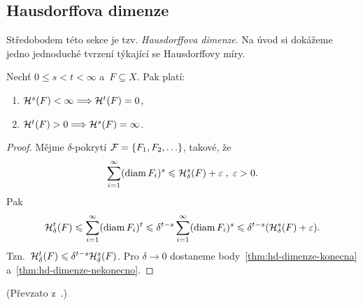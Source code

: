 \subsection{Hausdorffova dimenze}\label{subsec:hausdorffova-dimenze}

Středobodem této sekce je tzv. \emph{Hausdorffova dimenze}. Na úvod si dokážeme jedno jednoduché tvrzení týkající se Hausdorffovy míry.
\begin{theorem}\label{thm:hodnoty-hausdorffovy-miry}
    Nechť $0\leqslant s<t<\infty$ a~$F\subseteq X$. Pak platí:
    \begin{enumerate}[label=(\roman*)]
        \item\label{thm:hd-dimenze-konecna} $\mathcal{H}^{s}(F)<\infty\Longrightarrow\mathcal{H}^{t}(F)=0$,
        \item\label{thm:hd-dimenze-nekonecno} $\mathcal{H}^{t}(F)>0\Longrightarrow\mathcal{H}^{s}(F)=\infty$.
    \end{enumerate}
\end{theorem}
\begin{proof}
    Mějme $\delta$-pokrytí $\mathcal{F}=\left\{F_1,F_2,\ldots\right\}$, takové, že
    \[\sum_{i=1}^{\infty}(\operatorname{diam}{F_i})^s\leqslant\mathcal{H}_{\delta}^{s}(F)+\varepsilon\;,\;\varepsilon>0.\]
    Pak
    \[\mathcal{H}_{\delta}^{t}(F)\leqslant\sum_{i=1}^{\infty}(\operatorname{diam}{F_i})^t\leqslant\delta^{t-s}\sum_{i=1}^{\infty}(\operatorname{diam}{F_i})^s\leqslant\delta^{t-s}(\mathcal{H}_{\delta}^{s}(F)+\varepsilon).\]
    Tzn.~$\mathcal{H}_{\delta}^{t}(F)\leqslant\delta^{t-s}\mathcal{H}_{\delta}^{s}(F)$. Pro $\delta\to 0$ dostaneme body~\ref{thm:hd-dimenze-konecna} a~\ref{thm:hd-dimenze-nekonecno}.
\end{proof}
(Převzato z~\citep[str. 68]{Mattila1995}.)

